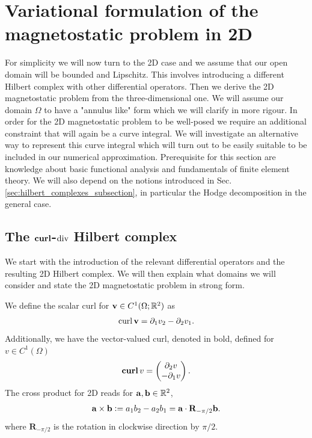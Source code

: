 \documentclass[../master_thesis.tex]{subfiles}
\begin{document}
\section{Variational formulation of the magnetostatic problem in 2D} 

For simplicity we will now turn to the 2D case and we assume that 
our open domain will be bounded and Lipschitz. This involves introducing
a different Hilbert complex with other differential operators. Then we 
derive the 2D magnetostatic problem from the three-dimensional one. 
We will assume our domain $\Omega$ to have a "annulus like" form which we 
will clarify in more rigour. In order for the 2D magnetostatic problem to be well-posed 
we require an additional constraint that will again be a curve integral. 
We will investigate an alternative way to represent this curve integral 
which will turn out to be easily suitable to be included in our numerical 
approximation. Prerequisite for this section are knowledge about basic functional analysis 
and fundamentals of finite element theory. We will also depend on the 
notions introduced in Sec.\,\ref{sec:hilbert_complexes_subsection}, in particular the Hodge decomposition in the general 
case.

\subsection{The $\veccurl$-$\operatorname{div}$ Hilbert complex}\label{sec:variational_formulation_of_the_magnetostatic_problem_in_2D}


We start with the introduction of the relevant differential operators and 
the resulting 2D Hilbert complex. We will then explain what domains we will consider 
and state the 2D magnetostatic problem in strong form.

We define the scalar curl for $\mathbf{v} \in C^1(\Omega;\mathbb{R}^2)$ as
\begin{align*}
    \operatorname{curl} \mathbf{v} = \partial_1 v_2 - \partial_2 v_1.
\end{align*}
Additionally, we have the vector-valued curl, denoted in bold, defined 
for $v \in C^1(\Omega)$
\begin{align*}
    \veccurl v = \begin{pmatrix}\partial_2 v \\ -\partial_1 v    \end{pmatrix}.
\end{align*}
The cross product for 2D reads for $\mathbf{a}, \mathbf{b} \in \mathbb{R}^2$,
\begin{align*}
    \mathbf{a} \times \mathbf{b} \vcentcolon= a_1 b_2- a_2 b_1 
    = \mathbf{a} \cdot \mathbf{R}_{-\pi/2}\mathbf{b}.
\end{align*}
where $\mathbf{R}_{-\pi/2}$ is the rotation in clockwise direction by $\pi/2$.
\end{document}
